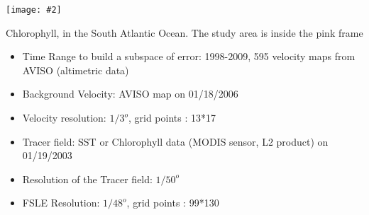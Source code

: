 \documentclass[portrait,a0,final,a4resizeable]{a0poster}
\newenvironment{poster}{
  \begin{center}
  \begin{minipage}[c]{1.0\textwidth}
}{
  \end{minipage} 
  \end{center}
}
\newenvironment{pcolumn}[1]{
  \begin{minipage}{#1\textwidth}
}{
  \end{minipage}
}
\newcommand{\myfig}[3][0]{
\begin{center}
  \vspace{0.10cm}
  \texttt{[image: \#2]}
\end{center}}
\begin{document}
\begin{poster}
\begin{multicols}{2}
\begin{center}
{    \vspace*{0.2cm}
    {\large  
    \vspace*{0.2cm}
\begin{minipage}{0.35\textwidth}
 
      \myfig{./pict/s_atl/s_atlb.eps}{0.99}
      \small{Chlorophyll, in the South Atlantic Ocean. The study area is inside the pink frame}
\end{minipage}
\begin{minipage}{0.65\textwidth}
  \begin{itemize}
    \item Time Range to build a subspace of error: 1998-2009, 595 velocity maps from AVISO (altimetric data)
    \item Background Velocity: AVISO map on 01/18/2006
    \item Velocity resolution: $1/3^o$, grid points : 13*17
    \item Tracer field: SST or Chlorophyll data (MODIS sensor, L2 product) on 01/19/2003
    \item Resolution of the Tracer field: $1/50^o$
    \item FSLE Resolution: $1/48^o$, grid points : 99*130
  \end{itemize}
\end{minipage}
%
  } %
  } %
  \end{center}
 

\end{multicols}
\end{poster}
\end{document}
